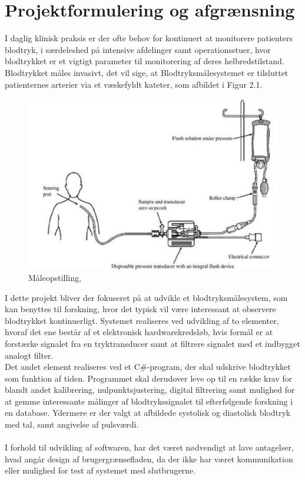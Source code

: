 \chapter{Projektformulering og afgrænsning}
I daglig klinisk praksis er der ofte behov for kontinuert at monitorere patienters blodtryk, i særdeleshed på intensive afdelinger samt operationsstuer, hvor blodtrykket er et vigtigt parameter til monitorering af deres helbredstilstand. \\
Blodtrykket måles invasivt, det vil sige, at Blodtryksmålesystemet er tilsluttet patienternes arterier via et væskefyldt kateter, som afbildet i Figur 2.1.
\begin{figure}[H]
	\centering
	\includegraphics[width=1\textwidth]{Figurer/Snip20151207_50}
	\caption{Måleopstilling, \protect\cite[s. 296]{Billed for invasiv blodtryksmaling}}
\end{figure}

I dette projekt bliver der fokuseret på at udvikle et blodtryksmålesystem, som kan benyttes til forskning, hvor det typisk vil være interessant at observere blodtrykket kontinuerligt.
Systemet realiseres ved udvikling af to elementer, hvoraf det ene består af et elektronisk hardwarekredsløb, hvis formål er at forstærke signalet fra en tryktransducer samt at filtrere signalet med et indbygget analogt filter.\\
Det andet element realiseres ved et C\#-program, der skal udskrive blodtrykket som funktion af tiden. Programmet skal derudover leve op til en række krav for blandt andet kalibrering, nulpunktsjustering, digital filtrering samt mulighed for at gemme interessante målinger af blodtrykssignalet til efterfølgende forskning i en database.
Ydermere er der valgt at afbildede systolisk og diastolisk blodtryk med tal, samt angivelse af pulsværdi.\\\\
I forhold til udvikling af softwaren, har det været nødvendigt at lave antagelser, hvad angår design af brugergrænsefladen, da der ikke har været kommunikation eller mulighed for test af systemet med slutbrugerne. 

